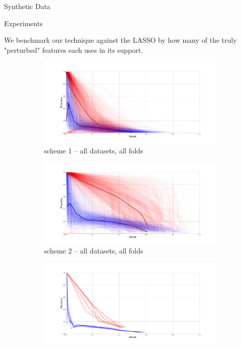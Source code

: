 \documentclass[svgnames,final]{beamer}
\begin{document}
\begin{frame}
\begin{columns}[T]
\begin{column}{.3\linewidth}
\begin{block}{Synthetic Data}
	\end{block}


	\begin{block}{Experiments}

		We benchmark our technique against the LASSO by how many of the truly "perturbed" features each uses in its support.

		\begin{figure}[h]
		\centering
		\begin{subfigure}{.5\textwidth}
		  \centering
		  \includegraphics[width=\linewidth]{images/2.pdf}
		  \caption{scheme 1 -- all datasets, all folds}
		  \label{fig:sub1}
		\end{subfigure}%
		\begin{subfigure}{.5\textwidth}
		  \centering
		  \includegraphics[width=\linewidth]{images/1.pdf}
		  \caption{scheme 2 -- all datasets, all folds}
		  \label{fig:sub2}
		\end{subfigure}
		\begin{subfigure}{.5\textwidth}
		  \centering
		  \includegraphics[width=\linewidth]{images/4.pdf}

\end{subfigure}
\end{figure}
\end{block}
\end{column}
\end{columns}
\end{frame}
\end{document}
